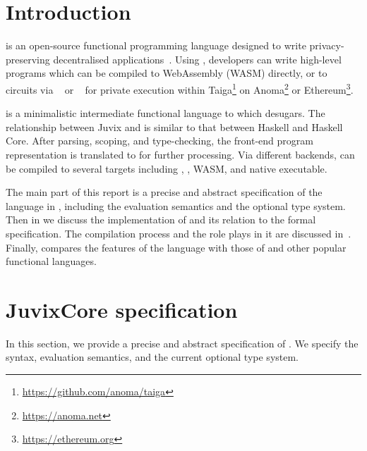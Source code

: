 \documentclass[
    9pt,            %
    techreport,        %
    affiltop,       %
]{art}
\begin{document}
\maketitle
\tableofcontents

\section{Introduction}

\Juvix{} is an open-source
functional programming language designed to write privacy-preserving
decentralised applications~\citep{anoma-juvix}. Using \Juvix{}, developers can write high-level
programs which can be compiled to WebAssembly (WASM) directly, or to circuits 
via \VampIR{}~\citep{anoma-vampir,juvix-to-vampir} or \Geb{}~\citep{anoma-geb, geb-pipeline} for
private execution 
within Taiga\footnote{\url{https://github.com/anoma/taiga}}
on Anoma\footnote{\url{https://anoma.net}} or
Ethereum\footnote{\url{https://ethereum.org}}.

\JuvixCore{} is a minimalistic intermediate functional language to which
\Juvix{} desugars. The relationship between Juvix and \JuvixCore{} is similar
to that between Haskell and Haskell Core. After parsing, scoping, and
type-checking, the \Juvix{} front-end program representation is translated to
\JuvixCore{} for further processing. Via different backends, \JuvixCore{}
can be compiled to several targets including 
\Geb{}, \VampIR{}, WASM, and native
executable.

The main part of this report is a precise and abstract specification of the
\JuvixCore{} language in , including the
evaluation semantics and the optional type system. Then in  we discuss the
implementation of \JuvixCore{} and its relation to the formal specification. The \Juvix{} compilation process and the role \JuvixCore{} plays in it are discussed in~.
Finally,  compares the features of the \JuvixCore{} language with those of \Juvix{} and other popular functional languages.

\section{JuvixCore specification}\label{sec_specification}

In this section, we provide a precise and abstract specification of
\JuvixCore{}. We specify the syntax, evaluation semantics, and the current
optional type system.
\end{document}
